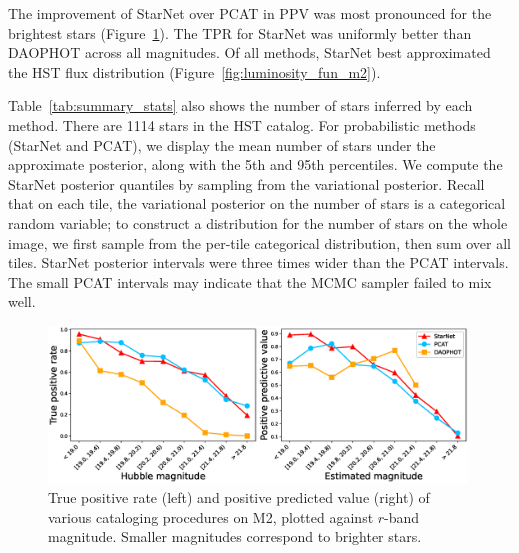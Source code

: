 The improvement of StarNet over PCAT in PPV was most pronounced for the brightest stars (Figure~\ref{fig:summary_stats}).
The TPR for StarNet was uniformly better than DAOPHOT across all magnitudes.
Of all methods, StarNet best approximated the HST flux distribution (Figure~\ref{fig:luminosity_fun_m2}).

Table~\ref{tab:summary_stats} also shows the number of stars inferred by each method.
There are 1114 stars in the HST catalog.
For probabilistic methods (StarNet and PCAT),
we display the mean number of stars under the approximate posterior, along with the 5th and 95th percentiles.
We compute the StarNet posterior quantiles by sampling from the variational posterior. 
Recall that on each tile, the variational posterior on the number of stars is a categorical random variable; 
to construct a distribution for the number of stars on the whole image, we first sample from the per-tile categorical distribution, then sum over all tiles. 
StarNet posterior intervals were three times wider than the PCAT intervals.
The small PCAT intervals may indicate that the MCMC sampler failed to mix well.





\begin{figure}[tb]
    \centering
    \includegraphics[width=0.99\textwidth]{figures_vg/m2_results/summary_statistics_m2.eps}
    \caption{True positive rate (left) and positive predicted value (right) of various cataloging
    procedures on M2, plotted against $r$-band magnitude.
    Smaller magnitudes correspond to brighter stars.
    }
    \label{fig:summary_stats}
\end{figure}

